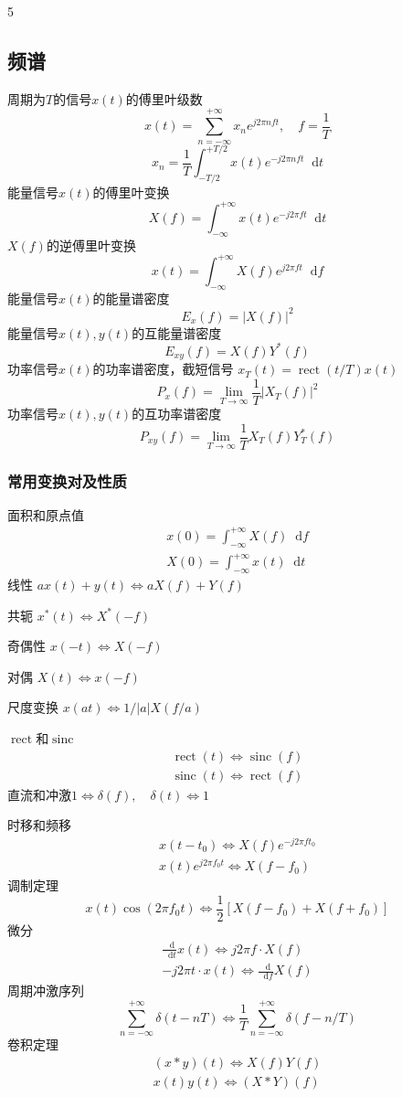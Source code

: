 \documentclass[8pt, a4paper]{extarticle}
\newcommand*{\dif}{\mathop{}\!\mathrm{d}}
\DeclareMathOperator{\sinc}{sinc}
\DeclareMathOperator{\rect}{rect}
\begin{document}
\begin{multicols}{5}
\subsection{频谱}
周期为\(T\)的信号\(x(t)\)的傅里叶级数
\[
x(t) = \sum_{n=-\infty}^{+\infty}x_n e^{j2\pi nft}, \quad f=\frac{1}{T}
\]
\[
x_n = \frac{1}{T}\int_{-T/2}^{+T/2}x(t)e^{-j2\pi nft}\dif t
\]
能量信号\(x(t)\)的傅里叶变换
\[
X(f)=\int_{-\infty}^{+\infty}x(t)e^{-j2\pi ft}\dif t
\]
\(X(f)\)的逆傅里叶变换
\[
x(t)=\int_{-\infty}^{+\infty}X(f)e^{j2\pi ft}\dif f
\]
能量信号\(x(t)\)的能量谱密度
\[
E_x(f) = |X(f)|^2
\]
能量信号\(x(t),y(t)\)的互能量谱密度
\[
E_{xy}(f) = X(f)Y^*(f)
\]
功率信号\(x(t)\)的功率谱密度，截短信号
\newline
\(x_T(t)=\rect(t/T) x(t)\)
\[
P_x(f) = \lim_{T\to\infty}\frac{1}{T}|X_T(f)|^2
\]
功率信号\(x(t),y(t)\)的互功率谱密度
\[
P_{xy}(f)=\lim_{T\to\infty}\frac{1}{T}X_T(f)Y_T^*(f)
\]

\subsubsection{常用变换对及性质}
面积和原点值
\begin{gather*}
x(0) = \int_{-\infty}^{+\infty}X(f)\dif f\\
X(0) = \int_{-\infty}^{+\infty}x(t)\dif t
\end{gather*}
线性
\(
ax(t)+y(t)\Leftrightarrow aX(f)+Y(f)
\)

共轭
\(
x^*(t) \Leftrightarrow X^*(-f)
\)

奇偶性
\(
x(-t) \Leftrightarrow X(-f)
\)

对偶
\(
X(t) \Leftrightarrow x(-f)
\)

尺度变换
\(
x(at) \Leftrightarrow 1/|a| X\left(f/a\right)
\)

\(\rect\)和\(\sinc\)
\begin{gather*}
\rect(t)\Leftrightarrow \sinc(f)\\
\sinc(t)\Leftrightarrow \rect(f)
\end{gather*}
直流和冲激\(1\Leftrightarrow \delta(f),\quad \delta(t)\Leftrightarrow 1\)

时移和频移
\begin{gather*}
x(t-t_0) \Leftrightarrow X(f)e^{-j2\pi ft_0}\\
x(t)e^{j2\pi f_0 t}\Leftrightarrow X(f-f_0)
\end{gather*}
调制定理
\[
x(t)\cos(2\pi f_0 t) \Leftrightarrow \frac{1}{2}[X(f-f_0)+X(f+f_0)]
\]
微分
\begin{gather*}
\frac{\dif}{\dif t}x(t) \Leftrightarrow j2\pi f \cdot X(f)\\
-j2\pi t \cdot x(t) \Leftrightarrow \frac{\dif}{\dif f}X(f)
\end{gather*}
周期冲激序列
\[
\sum_{n=-\infty}^{+\infty}\delta(t-nT) \Leftrightarrow \frac{1}{T}\sum_{n=-\infty}^{+\infty}\delta \left(f-n/T\right)
\]
卷积定理
\[
\begin{gathered}
(x\ast y)(t) \Leftrightarrow X(f)Y(f)\\
x(t)y(t) \Leftrightarrow (X\ast Y)(f)    
\end{gathered}
\]


\end{multicols}
\end{document}

